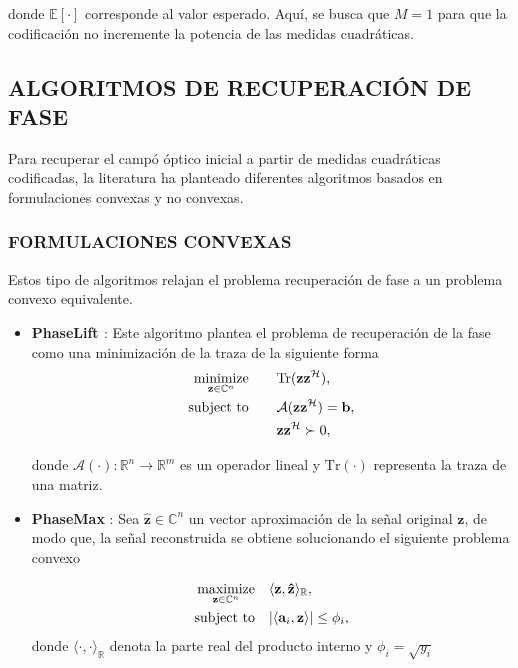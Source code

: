 donde $\mathbb{E}[\cdot]$ corresponde al valor esperado. Aquí, se busca que $M=1$ para que la codificación no incremente la potencia de las medidas cuadráticas.

\subsection{ALGORITMOS DE RECUPERACIÓN DE FASE}
Para recuperar el campó óptico inicial a partir de medidas cuadráticas codificadas, la literatura ha planteado diferentes algoritmos basados en formulaciones convexas y no convexas.

\subsubsection{FORMULACIONES CONVEXAS}

Estos tipo de algoritmos relajan el problema recuperación de fase a un problema convexo equivalente.

\begin{itemize}
    \item \textbf{PhaseLift \cite{candes2013phaselift}}:
    Este algoritmo plantea el problema de recuperación de la fase como una minimización de la traza de la siguiente forma
    \begin{equation}
        \begin{aligned}
            \operatorname*{minimize}_{\mathbf{z} \in \mathbb{C}^{n}} \quad & \quad \mathrm{Tr}(\mathbf{z}\mathbf{z}^{\mathcal{H}}), \\
            \operatorname*{subject \ to} \quad & \quad \mathcal{A}(\mathbf{z}\mathbf{z}^{\mathcal{H}}) = \mathbf{b}, \\
             &\quad  \mathbf{z}\mathbf{z}^{\mathcal{H}} \succ 0,
        \end{aligned}
    \end{equation}
    
    donde $\mathcal{A}( \cdot ): \mathbb{R}^{n} \rightarrow \mathbb{R}^{m}$ es un operador lineal y $\mathrm{Tr}(\cdot)$ representa la traza de una matriz.
    
    \item \textbf{PhaseMax} \cite{goldstein2018phasemax}:
    Sea $\mathbf{\hat{z}} \in \mathbb{C}^{n}$ un vector aproximación de la señal original $\mathbf{z}$, de modo que, la señal reconstruida se obtiene solucionando el siguiente problema convexo
        
    \begin{equation}
        \begin{aligned}
            \operatorname*{maximize}_{\mathbf{z}\in \mathbb{C}^n} \quad & \langle \mathbf{z}, \mathbf{\hat{z}} \rangle_{\mathbb{R}}, \\
            \operatorname*{subject \ to} \quad & \vert \langle \mathbf{a}_i,\mathbf{z} \rangle \vert \leq \phi_i,
        \end{aligned}
    \end{equation}
    donde $\langle \cdot, \cdot \rangle_{\mathbb{R}}$ denota la parte real del producto interno y $\phi_i = \sqrt{y_i}$
    
\end{itemize}

